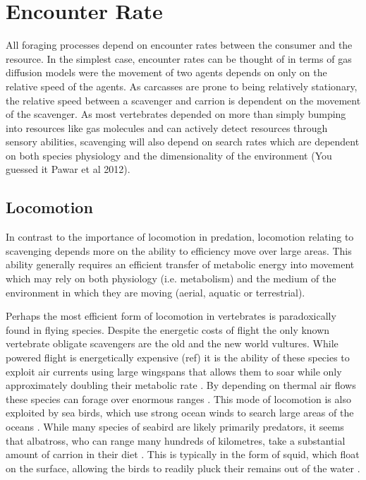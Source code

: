 \documentclass[a4paper,12pt]{article}
\begin{document}
\section*{Encounter Rate}
All foraging processes depend on encounter rates between the consumer and the resource. In the simplest case, encounter rates can be thought of in terms of gas diffusion models were the movement of two agents depends on only on the relative speed of the agents. As carcasses are prone to being relatively stationary, the relative speed between a scavenger and carrion is dependent on the movement of the scavenger. As most vertebrates depended on more than simply bumping into resources like gas molecules and can actively detect resources through sensory abilities, scavenging will also depend on search rates which are dependent on both species physiology and the dimensionality of the environment (You guessed it Pawar et al 2012).

\subsection*{Locomotion}
In contrast to the importance of locomotion in predation, locomotion relating to scavenging depends more on the ability to efficiency move over large areas. This ability generally requires an efficient transfer of metabolic energy into movement which may rely on both physiology (i.e. metabolism) and the medium of the environment in which they are moving (aerial, aquatic or terrestrial).

Perhaps the most efficient form of locomotion in vertebrates is paradoxically found in flying species. Despite the energetic costs of flight the only known vertebrate obligate scavengers are the old and the new world vultures. While powered flight is energetically expensive (ref) it is the ability of these species to exploit air currents using large wingspans that allows them to soar while only approximately doubling their metabolic rate \citep{hedenstrom1993migration,spivey2014analysing}. By depending on thermal air flows these species can forage over enormous ranges \citep{spiegel2013factors}. This mode of locomotion is also exploited by sea birds, which use strong ocean winds to search large areas of the oceans \citep{thaxter2012seabird}. While many species of seabird are likely primarily predators, it seems that albatross, who can range many hundreds of kilometres, take a substantial amount of carrion in their diet \citep{croxall1994dead}. This is typically in the form of squid, which float on the surface, allowing the birds to readily pluck their remains out of the water \citep{croxall1994dead}. 
\end{document}
